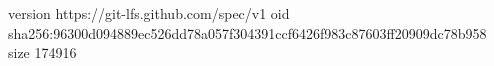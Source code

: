 version https://git-lfs.github.com/spec/v1
oid sha256:96300d094889ec526dd78a057f304391ccf6426f983c87603ff20909dc78b958
size 174916
